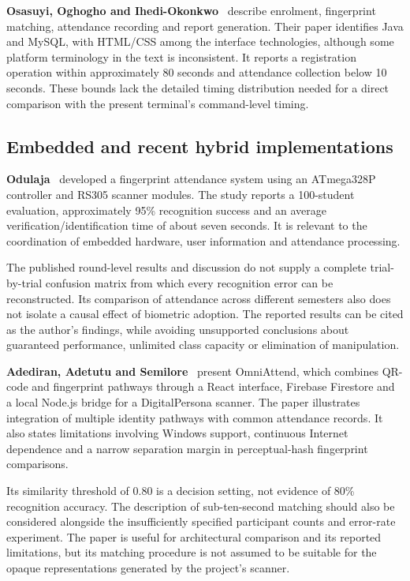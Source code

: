 \textbf{Osasuyi, Oghogho and Ihedi-Okonkwo}~\cite{osasuyi2020} describe enrolment, fingerprint matching, attendance recording and report generation. Their paper identifies Java and MySQL, with HTML/CSS among the interface technologies, although some platform terminology in the text is inconsistent. It reports a registration operation within approximately 80 seconds and attendance collection below 10 seconds. These bounds lack the detailed timing distribution needed for a direct comparison with the present terminal's command-level timing.

\subsection{Embedded and recent hybrid implementations}\label{sec:2-7-4}

\textbf{Odulaja}~\cite{odulaja2025} developed a fingerprint attendance system using an ATmega328P controller and RS305 scanner modules. The study reports a 100-student evaluation, approximately 95\% recognition success and an average verification/identification time of about seven seconds. It is relevant to the coordination of embedded hardware, user information and attendance processing.

The published round-level results and discussion do not supply a complete trial-by-trial confusion matrix from which every recognition error can be reconstructed. Its comparison of attendance across different semesters also does not isolate a causal effect of biometric adoption. The reported results can be cited as the author's findings, while avoiding unsupported conclusions about guaranteed performance, unlimited class capacity or elimination of manipulation.

\textbf{Adediran, Adetutu and Semilore}~\cite{adediran2026} present OmniAttend, which combines QR-code and fingerprint pathways through a React interface, Firebase Firestore and a local Node.js bridge for a DigitalPersona scanner. The paper illustrates integration of multiple identity pathways with common attendance records. It also states limitations involving Windows support, continuous Internet dependence and a narrow separation margin in perceptual-hash fingerprint comparisons.

Its similarity threshold of 0.80 is a decision setting, not evidence of 80\% recognition accuracy. The description of sub-ten-second matching should also be considered alongside the insufficiently specified participant counts and error-rate experiment. The paper is useful for architectural comparison and its reported limitations, but its matching procedure is not assumed to be suitable for the opaque representations generated by the project's scanner.

